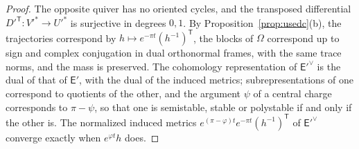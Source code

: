 \begin{proof}
The opposite quiver has no oriented cycles, and the transposed differential
$D'^{\mathsf T}:V'^*\to U'^*$ is surjective in degrees $0,1$. By
Proposition~\ref{prop:usedc}(b), the trajectories correspond by
$h\mapsto e^{-\pi t}(h^{-1})^{\mathsf T}$, the blocks of $\Omega$ correspond
up to sign and complex conjugation in dual orthonormal frames, with the same
trace norms, and the mass is preserved. The cohomology representation of
$\mathsf E'^\vee$ is the dual of that of $\mathsf E'$, with the dual of the
induced metrics; subrepresentations of one correspond to quotients of the
other, and the argument $\psi$ of a central charge corresponds to
$\pi-\psi$, so that one is semistable, stable or polystable if and only if
the other is. The normalized induced metrics
$e^{(\pi-\varphi)t}e^{-\pi t}(h^{-1})^{\mathsf T}$ of $\mathsf E'^\vee$
converge exactly when $e^{\varphi t}h$ does.
\end{proof}
